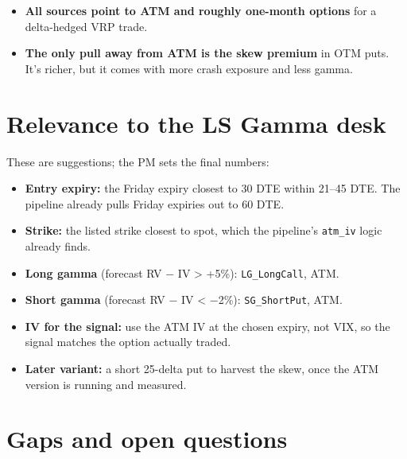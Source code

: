\documentclass{article}
\begin{document}
\begin{itemize}

\item \textbf{All sources point to ATM and roughly one-month options} for a delta-hedged VRP trade.

\item \textbf{The only pull away from ATM is the skew premium} in OTM puts. It's richer, but it comes with more crash exposure and less gamma.

\end{itemize}

\section{Relevance to the LS Gamma desk}

These are suggestions; the PM sets the final numbers:

\begin{itemize}

\item \textbf{Entry expiry:} the Friday expiry closest to 30 DTE within 21--45 DTE. The pipeline already pulls Friday expiries out to 60 DTE.

\item \textbf{Strike:} the listed strike closest to spot, which the pipeline's \texttt{atm\_\allowbreak{}iv} logic already finds.

\item \textbf{Long gamma} (forecast RV \ensuremath{-} IV > +5\%): \texttt{LG\_\allowbreak{}LongCall}, ATM.

\item \textbf{Short gamma} (forecast RV \ensuremath{-} IV < \ensuremath{-}2\%): \texttt{SG\_\allowbreak{}ShortPut}, ATM.

\item \textbf{IV for the signal:} use the ATM IV at the chosen expiry, not VIX, so the signal matches the option actually traded.

\item \textbf{Later variant:} a short 25-delta put to harvest the skew, once the ATM version is running and measured.

\end{itemize}

\section{Gaps and open questions}
\end{document}
